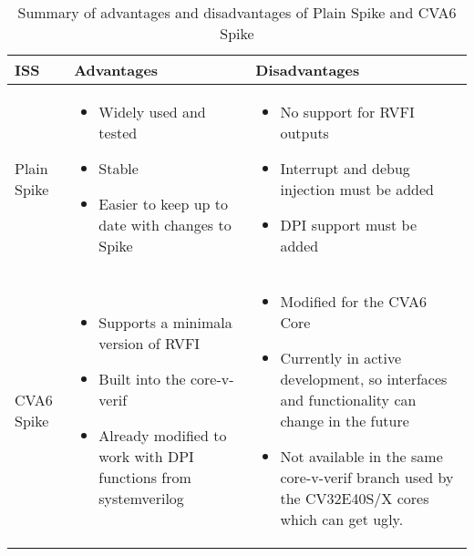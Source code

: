 \begin{table}[!htb]
\centering
\caption{Summary of advantages and disadvantages of Plain Spike and CVA6 Spike}
\label{tab:spikevsail}
\begin{tabularx}{\textwidth}{|p{15mm}|*{2}{>{\arraybackslash} X |}}
\hline
ISS & Advantages & Disadvantages \\
\hline
Plain Spike
& \begin{itemize}
\item Widely used and tested 
\item Stable 
\item Easier to keep up to date with changes to Spike
\end{itemize}
& \begin{itemize}
\item No support for RVFI outputs
\item Interrupt and debug injection must be added
\item DPI support must be added
\end{itemize} \\
\hline
CVA6 Spike
& \begin{itemize}
\item Supports a minimala version of RVFI 
\item Built into the core-v-verif
\item Already modified to work with DPI functions from systemverilog
\end{itemize}
& \begin{itemize}
\item Modified for the CVA6 Core
\item Currently in active development, so interfaces and functionality can change in the future
\item Not available in the same core-v-verif branch used by the CV32E40S/X cores which can get ugly.
\end{itemize} \\
\hline
\end{tabularx}
\end{table}







